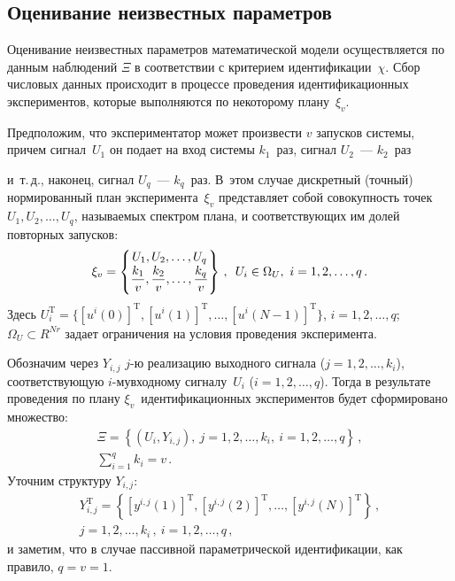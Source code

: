 \begin{multicols}{2}
\section{Оценивание неизвестных параметров}

  Оценивание неизвестных параметров математической модели
осуществляется по данным наблюдений $\Xi$ в соответствии с критерием
идентификации~$\chi$. Сбор числовых данных происходит в процессе
проведения идентификационных экспериментов, которые выполняются по
некоторому плану~$\xi_v$.

  Предположим, что экспериментатор может произвести $v$ запусков
системы, причем сигнал~$U_1$ он
 подает на вход системы $k_1$~раз, сигнал
$U_2$~--- $k_2$~раз\linebreak\vspace*{-12pt}

\pagebreak

\noindent
 и~т.\,д., наконец, сигнал $U_q$~--- $k_q$~раз. В~этом
случае дискретный (точный) нормированный план эксперимента~$\xi_v$
представляет собой совокупность точек $U_1, U_2, \ldots , U_q$, называемых
спектром плана, и соответствующих им долей повторных запусков:
  $$
  \xi_v=\left \{
  \begin{matrix}
  U_1, U_2, \ldots , U_q\\
  \displaystyle\frac{\displaystyle k_1\mathstrut}{\displaystyle v\mathstrut}, \displaystyle\frac{\displaystyle k_2\mathstrut}{\displaystyle v\mathstrut}, \ldots ,\displaystyle\frac{\displaystyle k_q\mathstrut}{\displaystyle v\mathstrut}
  \end{matrix}
  \right \}\,,
  \enskip U_i\in \Omega_U,\ i=1, 2, \ldots ,q\,.
  $$
Здесь $U_i^{\mathrm{T}}=\{[u^i(0)]^{\mathrm{T}}, [u^i(1)]^{\mathrm{T}}, \ldots , [u^i(N-1)]^{\mathrm{T}}\}$, $i=1, 2, \ldots , q$;
$\Omega_U\subset R^{Nr}$ задает ограничения на условия проведения
эксперимента.

  Обозначим через $Y_{i,j}$ $j$-ю реализацию выходного сигнала ($j=1, 2,
\ldots , k_i$), соответствующую $i$-му\linebreak входному сигналу~$U_i$
  ($i=1, 2, \ldots ,q$). Тогда в результате проведения по плану
$\xi_v$~идентификационных экспериментов будет сформировано множество:
  \begin{multline*}
  \Xi = \left\{ (U_i, Y_{i,j}),\ j=1, 2, \ldots ,
  k_i, \ i=1, 2, \ldots , q\right \}\,,\\
\sum\limits_{i=1}^q k_i=v\,.
  \end{multline*}
Уточним структуру $Y_{i,j}$:
\begin{multline*}
Y_{i,j}^{\mathrm{T}} =\left \{ \left[y^{i,j}(1)\right]^{\mathrm{T}}, \left [y^{i,j}(2)\right]^{\mathrm{T}}, \ldots , \left[
y^{i,j}(N)\right ]^{\mathrm{T}}\right \}\,,\\
j=1, 2,\ldots , k_i\,,\ i=1, 2, \ldots , q\,,
\end{multline*}
и заметим, что в случае пассивной параметрической идентификации, как
правило, $q=v=1$.


\end{multicols}
